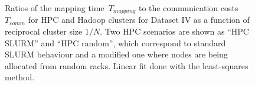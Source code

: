 \documentclass[11pt, oneside]{article}   	%
\begin{document}
\begin{figure}
	\small
	
	\normalsize
	\caption{Ratios of the mapping time~$T_{mapping}$ to the communication costs~$T_{comm}$ for HPC and Hadoop clusters for Dataset IV as a function of reciprocal cluster size $1/N$. Two HPC scenarios are shown as ``HPC SLURM'' and ``HPC random'', which correspond to standard SLURM behaviour and a modified one where nodes are being allocated from random racks.
Linear fit  done with the least-squares method.}
	\label{fig:fig3}
\end{figure}
\end{document}
